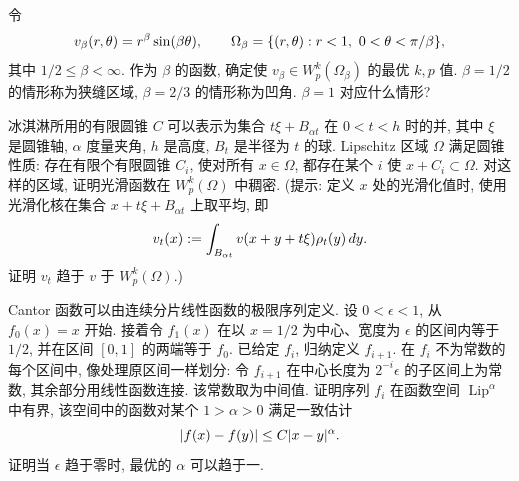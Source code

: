 \begin{MBExercise}
\label{ex:ch01-exercise-42}
令
\[
\MathBookFormulaID{formula-ch01-exercise-42-corner-function-domain}
v_\beta(r,\theta)=r^\beta\sin(\beta\theta),
\qquad
\Omega_\beta=\{(r,\theta):r<1,\ 0<\theta<\pi/\beta\},
\]
其中 $1/2\leq\beta<\infty$. 作为 $\beta$ 的函数, 确定使 $v_\beta\in W_p^k(\Omega_\beta)$ 的最优 $k,p$ 值. $\beta=1/2$ 的情形称为狭缝区域, $\beta=2/3$ 的情形称为凹角. $\beta=1$ 对应什么情形?
\end{MBExercise}

\begin{MBExercise}
\label{ex:ch01-exercise-43}
冰淇淋所用的有限圆锥 $C$ 可以表示为集合 $t\xi+B_{\alpha t}$ 在 $0<t<h$ 时的并, 其中 $\xi$ 是圆锥轴, $\alpha$ 度量夹角, $h$ 是高度, $B_t$ 是半径为 $t$ 的球. Lipschitz 区域 $\Omega$ 满足圆锥性质: 存在有限个有限圆锥 $C_i$, 使对所有 $x\in\Omega$, 都存在某个 $i$ 使 $x+C_i\subset\Omega$. 对这样的区域, 证明光滑函数在 $W_p^k(\Omega)$ 中稠密. (提示: 定义 $x$ 处的光滑化值时, 使用光滑化核在集合 $x+t\xi+B_{\alpha t}$ 上取平均, 即
\[
\MathBookFormulaID{formula-ch01-exercise-43-cone-mollification}
v_t(x):=\int_{B_{\alpha t}}v(x+y+t\xi)\rho_t(y)\,dy.
\]
证明 $v_t$ 趋于 $v$ 于 $W_p^k(\Omega)$.)
\end{MBExercise}

\begin{MBExercise}
\label{ex:ch01-exercise-44}
Cantor 函数可以由连续分片线性函数的极限序列定义. 设 $0<\epsilon<1$, 从 $f_0(x)=x$ 开始. 接着令 $f_1(x)$ 在以 $x=1/2$ 为中心、宽度为 $\epsilon$ 的区间内等于 $1/2$, 并在区间 $[0,1]$ 的两端等于 $f_0$. 已给定 $f_i$, 归纳定义 $f_{i+1}$. 在 $f_i$ 不为常数的每个区间中, 像处理原区间一样划分: 令 $f_{i+1}$ 在中心长度为 $2^{-i}\epsilon$ 的子区间上为常数, 其余部分用线性函数连接. 该常数取为中间值. 证明序列 $f_i$ 在函数空间 $\operatorname{Lip}^\alpha$ 中有界, 该空间中的函数对某个 $1>\alpha>0$ 满足一致估计
\[
\MathBookFormulaID{formula-ch01-exercise-44-holder-bound}
|f(x)-f(y)|\leq C|x-y|^\alpha.
\]
证明当 $\epsilon$ 趋于零时, 最优的 $\alpha$ 可以趋于一.
\end{MBExercise}
